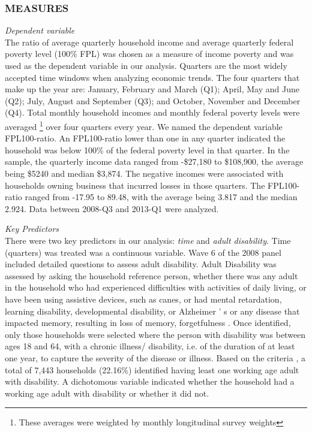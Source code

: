 \documentclass[11pt]{extarticle} %
\begin{document}
\subsubsection*{MEASURES}
\noindent
{\emph{Dependent variable}}\\
The ratio of average quarterly household income and average quarterly federal poverty level (100\% FPL) was chosen as a measure of income poverty and was used as the dependent variable in our analysis. Quarters are the most widely accepted time windows when analyzing economic trends. The four quarters that make up the year are: January, February and March (Q1); April, May and June (Q2); July, August and September (Q3); and October, November and December (Q4). Total monthly household incomes and monthly federal poverty levels were averaged \footnote{These averages were weighted by monthly longitudinal survey weights} over four quarters every year. We named the dependent variable FPL100-ratio. An FPL100-ratio lower than one in any quarter indicated the household was below 100\% of the federal poverty level in that quarter. In the sample, the quarterly income data ranged from -\$27,180 to \$108,900, the average being \$5240 and median \$3,874. The negative incomes were associated with households owning business that incurred losses in those quarters. The FPL100-ratio ranged from -17.95 to 89.48, with the average being 3.817 and the median 2.924. Data between 2008-Q3 and 2013-Q1 were analyzed.

\noindent
{\emph{Key Predictors}}\\
There were two key predictors in our analysis: {\emph{time}} and {\emph{adult disability}}. Time (quarters) was treated was a continuous variable. Wave 6 of the 2008 panel included detailed questions to assess adult disability. Adult Disability was assessed by asking the household reference person, whether there was any adult in the household who had experienced difficulties with activities of daily living, or have been using assistive devices, such as canes, or had mental retardation, learning disability, developmental disability, or Alzheimer ’ s or any disease that impacted memory, resulting in loss of memory, forgetfulness . Once identified, only those households were selected where the person with disability was between ages 18 and 64, with a chronic illness/ disability, i.e. of the duration of at least one year, to capture the severity of the disease or illness. Based on the criteria , a total of 7,443 households (22.16\%) identified having least one working age adult with disability. A dichotomous variable indicated whether the household had a working age adult with disability or whether it did not. 
\end{document}
